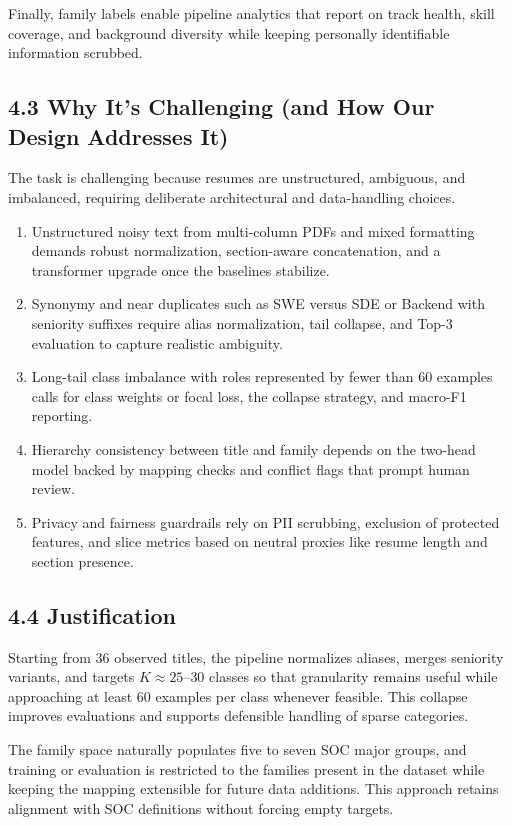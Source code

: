 \documentclass[12pt]{article}
\begin{document}
Finally, family labels enable pipeline analytics that report on track health, skill coverage, and background diversity while keeping personally identifiable information scrubbed.

\medskip

\subsection*{4.3 Why It's Challenging (and How Our Design Addresses It)}
The task is challenging because resumes are unstructured, ambiguous, and imbalanced, requiring deliberate architectural and data-handling choices.
\begin{enumerate}
  \item Unstructured noisy text from multi-column PDFs and mixed formatting demands robust normalization, section-aware concatenation, and a transformer upgrade once the baselines stabilize.
  \item Synonymy and near duplicates such as SWE versus SDE or Backend with seniority suffixes require alias normalization, tail collapse, and Top-3 evaluation to capture realistic ambiguity.
  \item Long-tail class imbalance with roles represented by fewer than 60 examples calls for class weights or focal loss, the collapse strategy, and macro-F1 reporting.
  \item Hierarchy consistency between title and family depends on the two-head model backed by mapping checks and conflict flags that prompt human review.
  \item Privacy and fairness guardrails rely on PII scrubbing, exclusion of protected features, and slice metrics based on neutral proxies like resume length and section presence.
\end{enumerate}

\medskip

\subsection*{4.4 Justification}
Starting from 36 observed titles, the pipeline normalizes aliases, merges seniority variants, and targets $K\approx25$--$30$ classes so that granularity remains useful while approaching at least 60 examples per class whenever feasible. This collapse improves evaluations and supports defensible handling of sparse categories.

\medskip

The family space naturally populates five to seven SOC major groups, and training or evaluation is restricted to the families present in the dataset while keeping the mapping extensible for future data additions. This approach retains alignment with SOC definitions without forcing empty targets.
\end{document}

